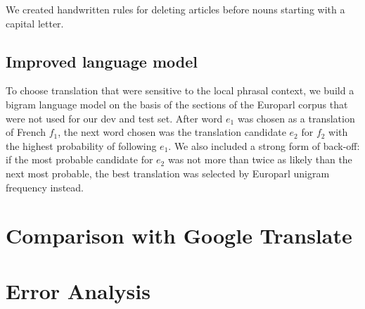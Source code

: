 \documentclass{article}
\begin{document}
We created handwritten rules for deleting articles before nouns starting with a capital letter.
 
\subsection{Improved language model}

To choose translation that were sensitive to the local phrasal context, we build a bigram language model on the basis of the sections of the Europarl corpus that were not used for our dev and test set. After word $e_1$ was chosen as a translation of French $f_1$, the next word chosen was the translation candidate $e_2$ for $f_2$ with the highest probability of following $e_1$. We also included a strong form of back-off: if the most probable candidate for $e_2$ was not more than twice as likely than the next most probable, the best translation was selected by Europarl unigram frequency instead.

\section{Comparison with Google Translate}

\section{Error Analysis}
\end{document}
